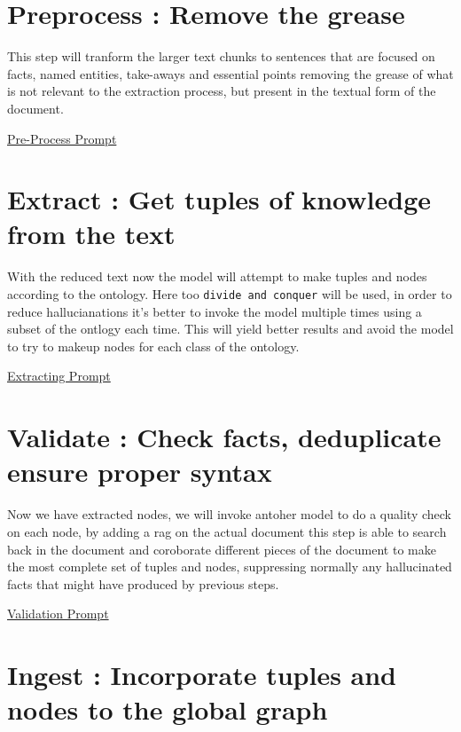 \documentclass[
  letterpaper,
  DIV=11,
  numbers=noendperiod]{scrreprt}
\begin{document}
\section{Preprocess : Remove the
grease}\label{preprocess-remove-the-grease}

This step will tranform the larger text chunks to sentences that are
focused on facts, named entities, take-aways and essential points
removing the grease of what is not relevant to the extraction process,
but present in the textual form of the document.

\href{./Prompt_Extraction_preprocess.qmd}{Pre-Process Prompt}

\section{Extract : Get tuples of knowledge from the
text}\label{extract-get-tuples-of-knowledge-from-the-text}

With the reduced text now the model will attempt to make tuples and
nodes according to the ontology. Here too \texttt{divide\ and\ conquer}
will be used, in order to reduce hallucianations it's better to invoke
the model multiple times using a subset of the ontlogy each time. This
will yield better results and avoid the model to try to makeup nodes for
each class of the ontology.

\href{./Prompt_Extraction.qmd}{Extracting Prompt}

\section{Validate : Check facts, deduplicate ensure proper
syntax}\label{validate-check-facts-deduplicate-ensure-proper-syntax}

Now we have extracted nodes, we will invoke antoher model to do a
quality check on each node, by adding a rag on the actual document this
step is able to search back in the document and coroborate different
pieces of the document to make the most complete set of tuples and
nodes, suppressing normally any hallucinated facts that might have
produced by previous steps.

\href{./Prompt_Extraction_validation.qmd}{Validation Prompt}

\section{Ingest : Incorporate tuples and nodes to the global
graph}\label{ingest-incorporate-tuples-and-nodes-to-the-global-graph}
\end{document}
